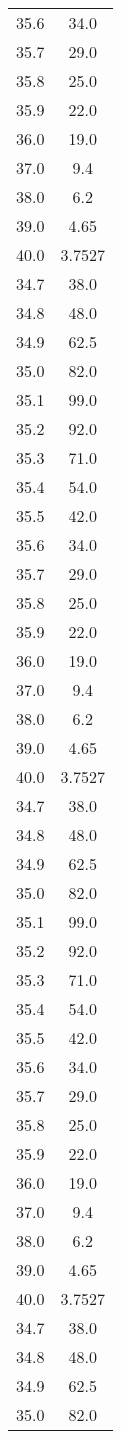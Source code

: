 \begin{table}
\begin{tabular}{S[]S[]}
35.6 & 34.0\\
35.7 & 29.0\\
35.8 & 25.0\\
35.9 & 22.0\\
36.0 & 19.0\\
37.0 & 9.4\\
38.0 & 6.2\\
39.0 & 4.65\\
40.0 & 3.7527\\
34.7 & 38.0\\
34.8 & 48.0\\
34.9 & 62.5\\
35.0 & 82.0\\
35.1 & 99.0\\
35.2 & 92.0\\
35.3 & 71.0\\
35.4 & 54.0\\
35.5 & 42.0\\
35.6 & 34.0\\
35.7 & 29.0\\
35.8 & 25.0\\
35.9 & 22.0\\
36.0 & 19.0\\
37.0 & 9.4\\
38.0 & 6.2\\
39.0 & 4.65\\
40.0 & 3.7527\\
34.7 & 38.0\\
34.8 & 48.0\\
34.9 & 62.5\\
35.0 & 82.0\\
35.1 & 99.0\\
35.2 & 92.0\\
35.3 & 71.0\\
35.4 & 54.0\\
35.5 & 42.0\\
35.6 & 34.0\\
35.7 & 29.0\\
35.8 & 25.0\\
35.9 & 22.0\\
36.0 & 19.0\\
37.0 & 9.4\\
38.0 & 6.2\\
39.0 & 4.65\\
40.0 & 3.7527\\
34.7 & 38.0\\
34.8 & 48.0\\
34.9 & 62.5\\
35.0 & 82.0\\

\end{tabular}
\end{table}
